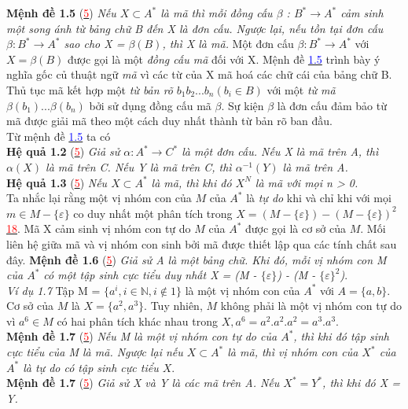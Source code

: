 \begin{flushleft}
\textbf{Mệnh đề 1.5} (\hyperlink{page.80}{\textcolor{red}{5}})  \textit{Nếu $X \subset A^*$ là mã thì mỗi đồng cấu $\beta$ : $B^* \to A^*$ cảm sinh một song ánh từ bảng chữ B đến X là đơn cấu. Ngược lại, nếu tồn tại đơn cấu $\beta : B^* \to A^*$ sao cho X = $\beta(B)$, thì X là mã.}
\hspace{10mm}Một đơn cấu $\beta : B^* \to A^*$ với $X = \beta(B)$ được gọi là một \textit{đồng cấu mã} đối với X. Mệnh đề \hyperlink{page.20}{\textcolor{blue}{1.5}} trình bày ý nghĩa gốc củ thuật ngữ \textit{mã} vì các từ của X mã hoá các chữ cái của bảng chữ B. Thủ tục mã kết hợp một \textit{từ bản rõ} $b_1b_2...b_n (b_i \in B)$ với một \textit{từ mã} $\beta(b_1)...\beta(b_n)$ bởi sử dụng đồng cấu mã $\beta$. Sự kiện $\beta$ là đơn cấu đảm bảo từ mã được giải mã theo một cách duy nhất thành từ bản rõ ban đầu.\\
\hspace{10mm} Từ mệnh đề \hyperlink{page.20}{\textcolor{blue}{1.5}} ta có \\
\textbf{Hệ quả 1.2} (\hyperlink{page.81}{\textcolor{red}{5}})  \textit{ Giả sử $\alpha : A^* \to C^*$ là một đơn cấu. Nếu X là mã trên A, thì $\alpha(X)$ là mã trên C. Nếu Y là mã trên C, thì $\alpha^{-1}(Y)$ là mã trên A.}\\
\textbf{Hệ quả 1.3} (\hyperlink{page.81}{\textcolor{red}{5}}) \textit{Nếu $X \subset A^*$ là mã, thì khi đó $X^N$ là mã với mọi n > 0.}\\
\hspace{10mm} Ta nhắc lại rằng một vị nhóm con của $M$ của $A^*$ là \textit{tự do} khi và chỉ khi với mọi $m \in M - \{ \varepsilon \}$ co duy nhất một phân tích trong $X = (M - \{ \varepsilon \}) - (M - \{ \varepsilon \})^{2}$\hyperlink{page.81}{\textcolor{red}{18}}. Mã X cảm sinh vị nhóm con tự do $M$ của $A^*$ được gọi là cơ sở của $M$. Mối liên hệ giữa mã và vị nhóm con sinh bởi mã được thiết lập qua các tính chất sau đây.
\textbf{Mệnh đề 1.6} (\hyperlink{page.80}{\textcolor{red}{5}}) \textit{Giả sử A là một bảng chữ. Khi đó, mỗi vị nhóm con M của $A^*$ có một tập sinh cực tiểu duy nhất X = (M - $\{ \varepsilon \}$) - (M - $\{ \varepsilon \}^{2}$)}.\\
\textit{Ví dụ 1.7}  Tập M = $\{ a^i, i \in \mathbb{N}, i \not\in 1 \}$ là một vị nhóm con của $A^*$ với $A = \{ a,b \}$. Cơ sở của $M$ là $X = \{ a^2, a^3 \}$. Tuy nhiên, $M$ không phải là một vị nhóm con tự do vì $a^6 \in M$ có hai phân tích khác nhau trong $X, a^6 = a^2.a^2.a^2 = a^3.a^3.$ \\
\textbf{Mệnh đề 1.7} (\hyperlink{page.81}{\textcolor{red}{5}}) \textit{Nếu M là một vị nhóm con tự do của $A^*$, thì khi đó tập sinh cực tiểu của M là mã. Ngược lại nếu $X \subset A^*$ là mã, thì vị nhóm con của $X^*$ của $A^*$ là tự do có tập sinh cực tiểu $X$}.\\
\textbf{Mệnh đề 1.7} (\hyperlink{page.81}{\textcolor{red}{5}})  \textit{Giả sử X và Y là các mã trên A. Nếu $X^* = Y^*$, thì khi đó X = Y.} \\

\end{flushleft}

